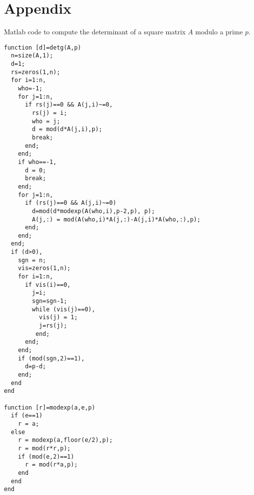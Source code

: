 \documentclass{tufte-handout}
\begin{document}
\section*{Appendix}
\noindent Matlab code to compute the determinant of a square matrix $A$ modulo a prime $p$.
\begin{verbatim}
function [d]=detg(A,p)
  n=size(A,1);
  d=1;
  rs=zeros(1,n);	
  for i=1:n,
    who=-1;
    for j=1:n,
      if rs(j)==0 && A(j,i)~=0,
        rs(j) = i;
        who = j;
        d = mod(d*A(j,i),p);
        break;
      end;
    end;
    if who==-1,
      d = 0;
      break;
    end;
    for j=1:n,
      if (rs(j)==0 && A(j,i)~=0)
        d=mod(d*modexp(A(who,i),p-2,p), p);
        A(j,:) = mod(A(who,i)*A(j,:)-A(j,i)*A(who,:),p);
      end;
    end;
  end;
  if (d>0),
    sgn = n;
    vis=zeros(1,n);
    for i=1:n,
      if vis(i)==0,
        j=i;
        sgn=sgn-1;
        while (vis(j)==0),
          vis(j) = 1;
          j=rs(j);
         end;
      end;
    end;
    if (mod(sgn,2)==1),
      d=p-d;
    end;		
  end
end

function [r]=modexp(a,e,p)
  if (e==1)
    r = a;
  else 
    r = modexp(a,floor(e/2),p);
    r = mod(r*r,p);
    if (mod(e,2)==1)
      r = mod(r*a,p);
    end
  end
end
\end{verbatim} 
\end{document}
